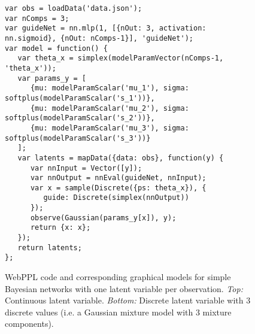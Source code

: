 \begin{figure}
\begin{minipage}{\linewidth}
\begin{minipage}{0.66\linewidth}
\begin{lstlisting}[style=smaller]
var obs = loadData('data.json');
var nComps = 3;
var guideNet = nn.mlp(1, [{nOut: 3, activation: nn.sigmoid}, {nOut: nComps-1}], 'guideNet');
var model = function() {
   var theta_x = simplex(modelParamVector(nComps-1, 'theta_x'));
   var params_y = [
      {mu: modelParamScalar('mu_1'), sigma: softplus(modelParamScalar('s_1'))},
      {mu: modelParamScalar('mu_2'), sigma: softplus(modelParamScalar('s_2'))},
      {mu: modelParamScalar('mu_3'), sigma: softplus(modelParamScalar('s_3'))}
   ];
   var latents = mapData({data: obs}, function(y) {
      var nnInput = Vector([y]);
      var nnOutput = nnEval(guideNet, nnInput);
      var x = sample(Discrete({ps: theta_x}), {
         guide: Discrete(simplex(nnOutput))
      });
      observe(Gaussian(params_y[x]), y);
      return {x: x};
   });
   return latents;
};
\end{lstlisting}
\end{minipage}
%
\begin{minipage}{0.33\linewidth}
\begin{flushright}
\end{flushright}
\end{minipage}
\end{minipage}

\caption{WebPPL code and corresponding graphical models for simple Bayesian networks with one latent variable per observation. \emph{Top:} Continuous latent variable. \emph{Bottom:} Discrete latent variable with 3 discrete values (i.e. a Gaussian mixture model with 3 mixture components).}
\label{fig:bn_oneLatent}

\end{figure}



